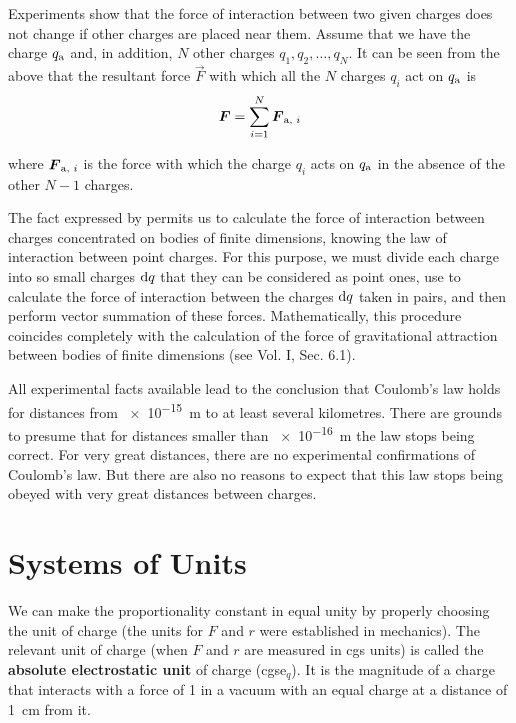 Experiments show that the force of interaction between two given charges does not change if other charges are placed near them. Assume that we have the charge $q_{\text{a}}$ and, in addition, $N$ other charges $q_1, q_2,\ldots, q_N$. It can be seen from the above that the resultant force $\vec{F}$ with which all the $N$ charges $q_i$ act on $q_{\text{a}}$ is
\begin{equation}\label{eq:1_5}
	\boldsymbol{F} = \sum_{i=1}^N \boldsymbol{F}_{\text{a, $i$}}
\end{equation}

\noindent
where $\boldsymbol{F}_{\text{a, $i$}}$ is the force with which the charge $q_i$ acts on $q_{\text{a}}$ in the absence of the other $N-1$ charges.

The fact expressed by  permits us to calculate the force of interaction between charges concentrated on bodies of finite dimensions, knowing the law of interaction between point charges. For this purpose, we must divide each charge into so small charges $\mathrm{d} q$ that they can be considered as point ones, use  to calculate the force of interaction between the charges $\mathrm{d} q$ taken in pairs, and then perform vector summation of these forces. Mathematically, this procedure coincides completely with the calculation of the force of gravitational attraction between bodies of finite dimensions (see Vol. I, Sec. 6.1).

All experimental facts available lead to the conclusion that Coulomb's law holds for distances from \SI{e-15}{\metre} to at least several kilometres. There are grounds to presume that for distances smaller than \SI{e-16}{\metre} the law stops being correct. For very great distances, there are no experimental confirmations of Coulomb's law. But there are also no reasons to expect that this law stops being obeyed with very great distances between charges.

\section{Systems of Units}\label{sec:1_3}

We can make the proportionality constant in  equal unity by properly choosing the unit of charge (the units for $F$ and $r$ were established in mechanics). The relevant unit of charge (when $F$ and $r$ are measured in cgs units) is called the \textbf{absolute electrostatic unit} of charge (cgse$_q$). It is the magnitude of a charge that interacts with a force of \SI{1}{\dyne} in a vacuum with an equal charge at a distance of \SI{1}{\centi\metre} from it.

